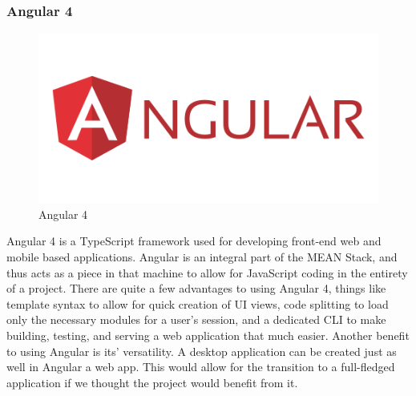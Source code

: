 \documentclass[12pt,a4paper]{report}
\begin{document}
			\subsubsection{Angular 4}
			\begin{figure}
				\includegraphics[scale=.3]{angular_4}
				\caption{Angular 4}
				\label{fig: Angular 4}
			\end{figure}
			Angular 4 is a TypeScript framework used for developing front-end web and mobile based applications. Angular is an integral part of the MEAN Stack, and thus acts as a piece in that machine to allow for JavaScript coding in the entirety of a project. There are quite a few advantages to using Angular 4, things like template syntax to allow for quick creation of UI views, code splitting to load only the necessary modules for a user's session, and a dedicated CLI to make building, testing, and serving a web application that much easier. Another benefit to using Angular is its' versatility. A desktop application can be created just as well in Angular a web app. This would allow for the transition to a full-fledged application if we thought the project would benefit from it.
			
			\newpage
\end{document}
